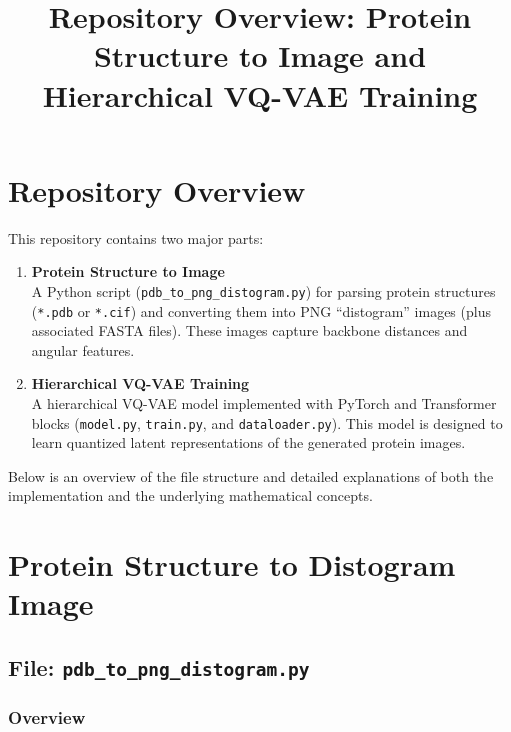 \documentclass[11pt]{article}
\title{Repository Overview: Protein Structure to Image and Hierarchical VQ-VAE Training}
\author{}
\date{}
\begin{document}
\maketitle

\section*{Repository Overview}

This repository contains two major parts:
\begin{enumerate}[label=\arabic*.]
  \item \textbf{Protein Structure to Image} \\
    A Python script (\texttt{pdb\_to\_png\_distogram.py}) for parsing protein structures (\texttt{*.pdb} or \texttt{*.cif}) and converting them into PNG “distogram” images (plus associated FASTA files). These images capture backbone distances and angular features.
    
  \item \textbf{Hierarchical VQ-VAE Training} \\
    A hierarchical VQ-VAE model implemented with PyTorch and Transformer blocks (\texttt{model.py}, \texttt{train.py}, and \texttt{dataloader.py}). This model is designed to learn quantized latent representations of the generated protein images.
\end{enumerate}

Below is an overview of the file structure and detailed explanations of both the implementation and the underlying mathematical concepts.

\section{Protein Structure to Distogram Image}

\subsection*{File: \texttt{pdb\_to\_png\_distogram.py}}

\subsubsection*{Overview}
\end{document}
